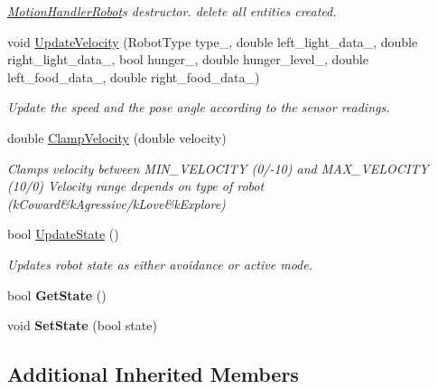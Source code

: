 \begin{DoxyCompactItemize}
\begin{DoxyCompactList}\small\item\em \hyperlink{classMotionHandlerRobot}{Motion\+Handler\+Robot}\textquotesingle{}s destructor. {\ttfamily delete} all entities created. \end{DoxyCompactList}\item 
void \hyperlink{classMotionHandlerRobot_a05684e5f7af3ca1ad90881ab6d709797}{Update\+Velocity} (Robot\+Type type\+\_\+, double left\+\_\+light\+\_\+data\+\_\+, double right\+\_\+light\+\_\+data\+\_\+, bool hunger\+\_\+, double hunger\+\_\+level\+\_\+, double left\+\_\+food\+\_\+data\+\_\+, double right\+\_\+food\+\_\+data\+\_\+)
\begin{DoxyCompactList}\small\item\em Update the speed and the pose angle according to the sensor readings. \end{DoxyCompactList}\item 
double \hyperlink{classMotionHandlerRobot_abf7ffd4f225c59640a0031b60329182e}{Clamp\+Velocity} (double velocity)
\begin{DoxyCompactList}\small\item\em Clamps velocity between M\+I\+N\+\_\+\+V\+E\+L\+O\+C\+I\+TY (0/-\/10) and M\+A\+X\+\_\+\+V\+E\+L\+O\+C\+I\+TY (10/0) Velocity range depends on type of robot (k\+Coward\&k\+Agressive/k\+Love\&k\+Explore) \end{DoxyCompactList}\item 
bool \hyperlink{classMotionHandlerRobot_abbf0fa228b79cd829d1aac3fd52a3f8d}{Update\+State} ()
\begin{DoxyCompactList}\small\item\em Updates robot state as either avoidance or active mode. \end{DoxyCompactList}\item 
bool {\bfseries Get\+State} ()\hypertarget{classMotionHandlerRobot_ad2fe7272b8b83eba102b1547cd931d5c}{}\label{classMotionHandlerRobot_ad2fe7272b8b83eba102b1547cd931d5c}

\item 
void {\bfseries Set\+State} (bool state)\hypertarget{classMotionHandlerRobot_a62b238810f1068ef98d5d2a18cb2180c}{}\label{classMotionHandlerRobot_a62b238810f1068ef98d5d2a18cb2180c}

\end{DoxyCompactItemize}
\subsection*{Additional Inherited Members}


